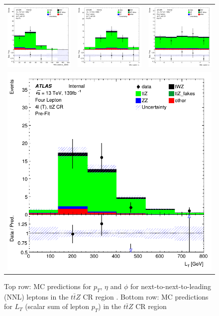 \begin{figure}[htbp]
    \centering
  \begin{tabular}{ccc}



    \includegraphics[width=.2\textwidth]{figures/PreFitPlots/lep4_ttZ_4T_NNL_lepton_pt} &
    \includegraphics[width=.2\textwidth]{figures/PreFitPlots/lep4_ttZ_4T_NNL_lepton_eta} &
    \includegraphics[width=.2\textwidth]{figures/PreFitPlots/lep4_ttZ_4T_NNL_lepton_phi} \\
    \multicolumn{3}{c}{\includegraphics[width=.2\textwidth]{figures/PreFitPlots/lep4_ttZ_4T_LT} }\\

  \end{tabular}
  \caption{Top row: MC predictions for $p_{T}$, $\eta$ and $\phi$ for next-to-next-to-leading (NNL) leptons in the $t\bar{t}Z$ CR region . Bottom row: MC predictions for $L_{T}$ (scalar sum of lepton $p_{T}$)  in the $t\bar{t}Z$ CR region }
  \label{fig:4lep-ttZ-CR-leptonPlots}
\end{figure}

